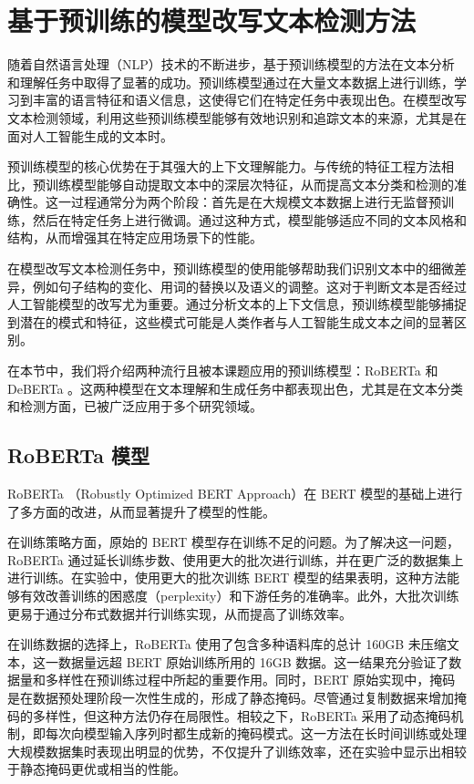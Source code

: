 \section{基于预训练的模型改写文本检测方法}
\label{sec:method-pretrain}

随着自然语言处理（NLP）技术的不断进步，基于预训练模型的方法在文本分析和理解任务中取得了显著的成功。预训练模型通过在大量文本数据上进行训练，学习到丰富的语言特征和语义信息，这使得它们在特定任务中表现出色。在模型改写文本检测领域，利用这些预训练模型能够有效地识别和追踪文本的来源，尤其是在面对人工智能生成的文本时。

预训练模型的核心优势在于其强大的上下文理解能力。与传统的特征工程方法相比，预训练模型能够自动提取文本中的深层次特征，从而提高文本分类和检测的准确性。这一过程通常分为两个阶段：首先是在大规模文本数据上进行无监督预训练，然后在特定任务上进行微调。通过这种方式，模型能够适应不同的文本风格和结构，从而增强其在特定应用场景下的性能。

在模型改写文本检测任务中，预训练模型的使用能够帮助我们识别文本中的细微差异，例如句子结构的变化、用词的替换以及语义的调整。这对于判断文本是否经过人工智能模型的改写尤为重要。通过分析文本的上下文信息，预训练模型能够捕捉到潜在的模式和特征，这些模式可能是人类作者与人工智能生成文本之间的显著区别。

在本节中，我们将介绍两种流行且被本课题应用的预训练模型：RoBERTa \cite{liu_roberta_2019} 和 DeBERTa \cite{he_deberta_2021, he2023debertav3improvingdebertausing}。这两种模型在文本理解和生成任务中都表现出色，尤其是在文本分类和检测方面，已被广泛应用于多个研究领域。


\subsection{RoBERTa 模型}
\label{sec:method-pretrain-roberta}

RoBERTa \cite{liu_roberta_2019}（Robustly Optimized BERT Approach）在 BERT \cite{devlin_bert_2019} 模型的基础上进行了多方面的改进，从而显著提升了模型的性能。

在训练策略方面，原始的 BERT 模型存在训练不足的问题。为了解决这一问题，RoBERTa 通过延长训练步数、使用更大的批次进行训练，并在更广泛的数据集上进行训练。在实验中，使用更大的批次训练 BERT 模型的结果表明，这种方法能够有效改善训练的困惑度（perplexity）和下游任务的准确率。此外，大批次训练更易于通过分布式数据并行训练实现，从而提高了训练效率。

在训练数据的选择上，RoBERTa 使用了包含多种语料库的总计 160GB 未压缩文本，这一数据量远超 BERT 原始训练所用的 16GB 数据。这一结果充分验证了数据量和多样性在预训练过程中所起的重要作用。同时，BERT 原始实现中，掩码是在数据预处理阶段一次性生成的，形成了静态掩码。尽管通过复制数据来增加掩码的多样性，但这种方法仍存在局限性。相较之下，RoBERTa 采用了动态掩码机制，即每次向模型输入序列时都生成新的掩码模式。这一方法在长时间训练或处理大规模数据集时表现出明显的优势，不仅提升了训练效率，还在实验中显示出相较于静态掩码更优或相当的性能。

